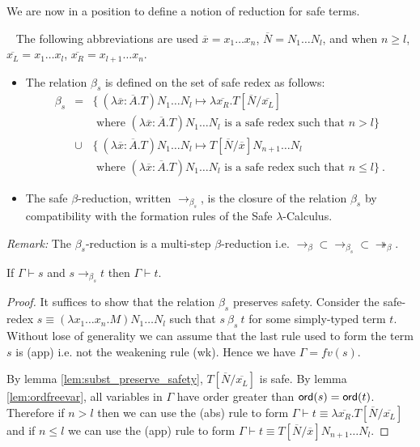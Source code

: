 \documentclass{llncs}
\newcommand\betared{\rightarrow_\beta}
\newcommand\betasred{\rightarrow_{\beta_s}}
\newcommand\betaredtr{\twoheadrightarrow_\beta} %
\newcommand\subst[2]{\left[ #1/#2 \right]}
\newcommand\ord[1]{{\sf ord}(#1)}
\begin{document}
We are now in a position to define a notion of reduction for safe terms.

\begin{definition} \
\label{dfn:safereduction} The following
abbreviations are used $\overline{x} = x_1 \ldots x_n$,
$\overline{N} = N_1 \ldots N_l$, and when $n\geq l$, $\overline{x_L}
= x_1 \ldots x_l$, $\overline{x_R} = x_{l+1} \ldots x_n$.
\begin{itemize}
\item The relation $\beta_s$ is defined on the set of safe redex as follows:
\begin{eqnarray*}
\beta_s &=&
\{  \ (\lambda \overline{x} : \overline{A} . T) N_1 \ldots N_l \mapsto \lambda \overline{x_R}. T\subst{\overline{N}}{\overline{x_L}}  \\
&& \mbox{ where $(\lambda \overline{x} : \overline{A} . T) N_1 \ldots N_l$ is a safe redex such that $n> l$}
\} \\
&\cup&
\{ \ (\lambda \overline{x} : \overline{A} . T) N_1 \ldots N_l \mapsto T\subst{\overline{N}}{\overline{x}} N_{n+1} \ldots N_l  \\
&& \mbox{ where $(\lambda \overline{x} : \overline{A} . T) N_1 \ldots N_l$ is a safe redex such that $n\leq l$}
\} \ .
\end{eqnarray*}

\item
The safe $\beta$-reduction, written $\betasred$, is the closure of
the relation $\beta_s$ by compatibility with the formation rules of
the Safe $\lambda$-Calculus.
\end{itemize}
\end{definition}

\noindent \emph{Remark:} The $\beta_s$-reduction is a multi-step $\beta$-reduction i.e. $\betared \subset \betasred \subset \betaredtr$.


\begin{lemma}
\label{lem:homoh_safered_preserve_safety}
If $\Gamma \vdash s$ and $s \betasred t$ then $\Gamma \vdash t$.
\end{lemma}

\begin{proof}
It suffices to show that the relation $\beta_s$ preserves safety.
Consider the safe-redex $ s \equiv (\lambda x_1 \ldots x_n . M) N_1 \ldots N_l $ such that
$s\ \beta_s\ t$ for some simply-typed term $t$.
Without lose of generality we can assume that the last rule used to form the term $s$ is {\sf(app)} i.e. not the weakening rule
{\sf(wk)}. Hence we have $\Gamma = fv(s)$.

By lemma \ref{lem:subst_preserve_safety}, $T\subst{\overline{N}}{\overline{x_L}}$ is safe.
By lemma \ref{lem:ordfreevar}, all variables in $\Gamma$ have order greater than $\ord{s} = \ord{t}$. Therefore
if $n>l$ then we can use the {\sf(abs)} rule to form $\Gamma \vdash t \equiv \lambda \overline{x_R}. T\subst{\overline{N}}{\overline{x_L}}$
and if $n \leq l$ we can use the {\sf(app)} rule to form $\Gamma \vdash t \equiv  T\subst{\overline{N}}{\overline{x}} N_{n+1} \ldots N_l$.
\end{proof}
\end{document}
